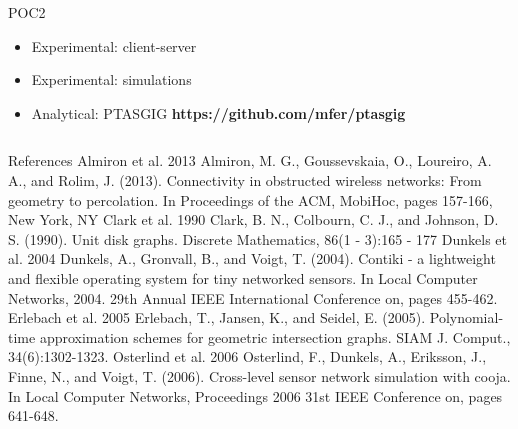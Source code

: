 \documentclass[final,hyperref={pdfpagelabels=false}]{beamer}
\begin{document}
\begin{frame}{}
\begin{columns}[t]
\begin{column}{.48\linewidth}
\begin{block}{POC2}
          \begin{itemize}
          \item Experimental: client-server
          \item Experimental: simulations
          \item Analytical: PTASGIG {\bf https://github.com/mfer/ptasgig}          
          \end{itemize}  
        \end{block}
      \end{column}
    \end{columns}
    \begin{block}{\footnotesize References}
      \scriptsize
      {\normalsize Almiron et al. 2013} Almiron, M. G., Goussevskaia, O., Loureiro, A. A., 
        and Rolim, J. (2013). Connectivity in obstructed wireless networks: From geometry to 
        percolation. In Proceedings of the ACM, MobiHoc, pages 157-166, New York, NY \newline
      {\normalsize Clark et al. 1990} Clark, B. N., Colbourn, C. J., and Johnson, D. S. (1990). 
        Unit disk graphs. Discrete Mathematics, 86(1 - 3):165 - 177\newline
      {\normalsize Dunkels et al. 2004} Dunkels, A., Gronvall, B., and Voigt, T. (2004). 
        Contiki - a lightweight and flexible operating system for tiny networked sensors. 
        In Local Computer Networks, 2004. 29th Annual IEEE International Conference on, 
        pages 455-462.\newline
      {\normalsize Erlebach et al. 2005} Erlebach, T., Jansen, K., and Seidel, E. (2005). 
        Polynomial-time approximation schemes for geometric intersection graphs. SIAM J. 
        Comput., 34(6):1302-1323. \newline
      {\normalsize Osterlind et al. 2006}  Osterlind, F., Dunkels, A., Eriksson, J., Finne, 
        N., and Voigt, T. (2006). Cross-level sensor network simulation with cooja. In Local 
        Computer Networks, Proceedings 2006 31st IEEE Conference on, pages 641-648.
    \end{block}    
  \end{frame}
\end{document}
